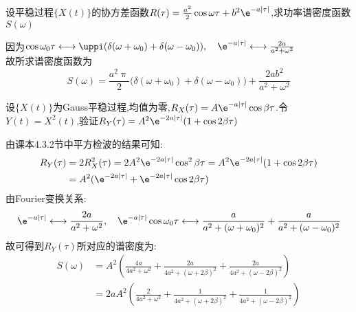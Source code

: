 \begin{problem}{4.22}
设平稳过程$\{X(t)\}$的协方差函数$R(\tau)=\frac{a^2}{2}\cos \omega \tau +b^2\e^{-a|\tau|}$,求功率谱密度函数$S(\omega )$
\end{problem}
\begin{solution}
	因为$\cos \omega_0 \tau \longleftrightarrow \uppi(\delta(\omega+\omega_0)+\delta(\omega-\omega_0)),\quad \e^{-a|\tau|}\longleftrightarrow \frac{2a}{a^2+\omega ^2}$\\
	故所求谱密度函数为\[S(\omega) = \frac{a^2 \uppi}{2}\big(\delta(\omega+\omega_0)+\delta(\omega-\omega_0)\big)+\frac{2ab^2}{a^2+\omega ^2}\]
\end{solution}

\begin{problem}{4.23}
设$\{X(t)\}$为Gauss平稳过程,均值为零,$R_X(\tau)=A\e^{-a|\tau|}\cos \beta \tau$.令$Y(t)=X^2(t)$,验证$R_Y(\tau)=A^2\e^{-2a|\tau|}(1+\cos 2\beta \tau)$
\end{problem}
\begin{solution}
	由课本4.3.2节中平方检波的结果可知:
	\[\begin{split}
			R_Y(\tau) &= 2R_X^2(\tau) = 2A^2 \e^{-2a |\tau|}\cos^2 \beta\tau = A^2\e^{-2a|\tau|}(1+\cos 2\beta\tau)\\
			&= A^2 (\e^{-2a|\tau|}+\e^{-2a|\tau|}\cos 2\beta\tau)
		\end{split}\]
	由Fourier变换关系:
	\[\e^{-a|\tau|}\longleftrightarrow \frac{2a}{a^2+\omega^2},\quad \e^{-a|\tau|}\cos \omega_0\tau \longleftrightarrow \frac{a}{a^2+(\omega+\omega_0)^2}+\frac{a}{a^2+(\omega-\omega_0)^2}\]
	故可得到$R_Y(\tau)$所对应的谱密度为:
	\[\begin{split}
			S(\omega) &= A^2 \left(\frac{4a}{4a^2+\omega^2}+\frac{2a}{4a^2+(\omega+2\beta)^2}+\frac{2a}{4a^2+(\omega-2\beta)^2}\right)\\
			&= 2aA^2 \left(\frac{2}{4a^2+\omega^2}+\frac{1}{4a^2+(\omega+2\beta)^2}+\frac{1}{4a^2+(\omega-2\beta)^2}\right)
		\end{split}\]
\end{solution}

